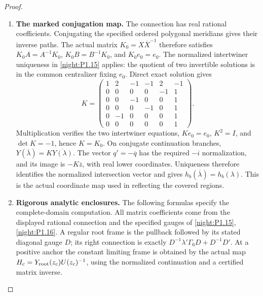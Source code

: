 \begin{proof}
\begin{enumerate}[label=\arabic*.]
\item \textbf{The marked conjugation map.}
The connection has real rational coefficients. Conjugating the
specified ordered polygonal meridians gives their inverse paths.
The actual matrix $K_0=X\overline X^{-1}$ therefore satisfies
$K_0A=A^{-1}K_0$, $K_0B=B^{-1}K_0$, and $K_0e_0=e_0$.
The normalized intertwiner uniqueness in \cref{night:P1.15}
applies: the quotient of two invertible solutions is in the
common centralizer fixing $e_0$. Direct exact solution gives
\[
 K=\begin{pmatrix}
 1&2&-1&-1&2&-1\\
 0&0&0&0&-1&1\\
 0&0&-1&0&0&1\\
 0&0&0&-1&0&1\\
 0&-1&0&0&0&1\\
 0&0&0&0&0&1
 \end{pmatrix}.
\]
Multiplication verifies the two intertwiner equations,
$Ke_0=e_0$, $K^2=I$, and $\det K=-1$, hence $K=K_0$.
On conjugate continuation branches,
$Y(\overline\lambda)=K\overline{Y(\lambda)}$.
The vector $q'=-\overline q$ has the required $-i$ normalization,
and its image is $-K\overline z$, with real lower coordinates.
Uniqueness therefore identifies the normalized intersection
vector and gives
$h_b(\overline\lambda)=h_b(\lambda)$.
This is the actual coordinate map used in reflecting the covered
regions.

\item \textbf{Rigorous analytic enclosures.}
The following formulas specify the complete-domain computation.
All matrix coefficients come from the displayed rational
connection and the specified gauges of
\cref{night:P1.15}, \cref{night:P1.16}. A regular root frame is the
pullback followed by its stated diagonal gauge $D$; its right
connection is exactly
$D^{-1}\lambda'\Gamma_6D+D^{-1}D'$.
At a positive anchor the constant limiting frame is obtained by
the actual map $H_c=Y_{\rm root}(z_c)U(z_c)^{-1}$, using the
normalized continuation and a certified matrix inverse.


\end{enumerate}
\end{proof}
